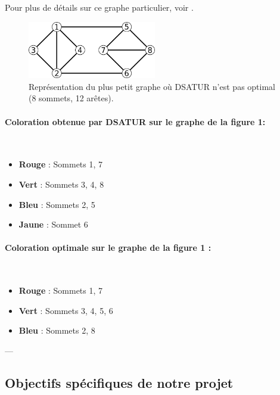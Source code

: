 \documentclass[11pt]{article}
\begin{document}
Pour plus de détails sur ce graphe particulier, voir \cite{smallest_hard_dsatur}.

\begin{figure}[H] %
    \centering
    \includegraphics[width=0.5\textwidth]{JKMP_graphe.png}
    \caption{Représentation du plus petit graphe où DSATUR n'est pas optimal (8 sommets, 12 arêtes).}
    \label{fig:dsatur_non_optimal_graph}
\end{figure}
\paragraph{Coloration obtenue par DSATUR sur le graphe de la figure 1:} \\
\begin{itemize}
    \item \textbf{Rouge} : Sommets 1, 7
    \item \textbf{Vert} : Sommets 3, 4, 8
    \item \textbf{Bleu} : Sommets 2, 5
    \item \textbf{Jaune} : Sommet 6
\end{itemize}

\paragraph{Coloration optimale sur le graphe de la figure 1 :} \\
\begin{itemize}
    \item \textbf{Rouge} : Sommets 1, 7
    \item \textbf{Vert} : Sommets 3, 4, 5, 6
    \item \textbf{Bleu} : Sommets 2, 8
\end{itemize}

---

\subsection{Objectifs spécifiques de notre projet}
\end{document}
